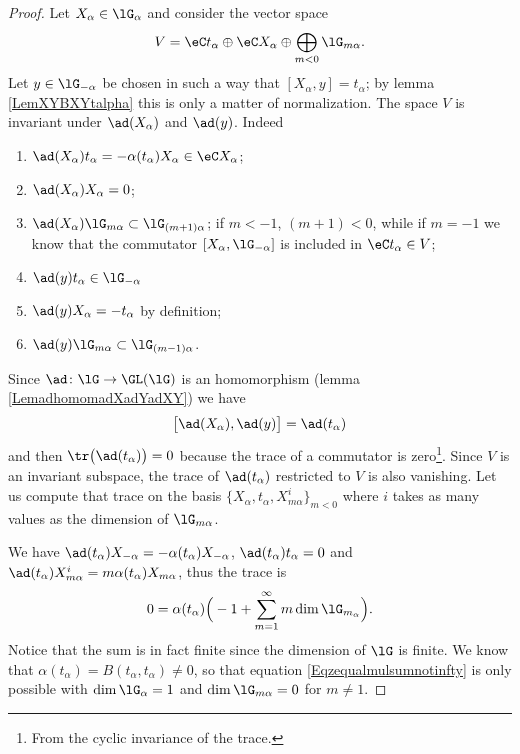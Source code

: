 \begin{proof}
    Let \( X_{\alpha}\in\lG_{\alpha}\) and consider the vector space
    \begin{equation}
        V=\eC t_{\alpha}\oplus\eC X_{\alpha}\oplus\bigoplus_{m<0}\lG_{m\alpha}.
    \end{equation}
    Let \( y\in\lG_{-\alpha}\) be chosen in such a way that \( [X_{\alpha},y]=t_{\alpha}\); by lemma \ref{LemXYBXYtalpha} this is only a matter of normalization. The space \( V\) is invariant under \( \ad(X_{\alpha})\) and \( \ad(y)\). Indeed
    \begin{enumerate}
        \item
            \( \ad(X_{\alpha})t_{\alpha}=-\alpha(t_{\alpha})X_{\alpha}\in\eC X_{\alpha}\);
        \item
            \( \ad(X_{\alpha})X_{\alpha}=0\);
        \item
            \( \ad(X_{\alpha})\lG_{m\alpha}\subset\lG_{(m+1)\alpha}\); if \( m<-1\), \( (m+1)<0\), while if \( m=-1\) we know that the commutator \( [X_{\alpha},\lG_{-\alpha}]\) is included in \( \eC t_{\alpha}\in V\);
        \item
            \( \ad(y)t_{\alpha}\in\lG_{-\alpha}\)
        \item
            \( \ad(y)X_{\alpha}=-t_{\alpha}\) by definition;
        \item
            \( \ad(y)\lG_{m\alpha}\subset\lG_{(m-1)\alpha}\).
    \end{enumerate}
    Since \( \ad\colon \lG\to \GL(\lG)\) is an homomorphism (lemma \ref{LemadhomomadXadYadXY}) we have
    \begin{equation}
        \big[ \ad(X_{\alpha}),\ad(y) \big]=\ad(t_{\alpha})
    \end{equation}
    and then \( \tr\big( \ad(t_{\alpha}) \big)=0\) because the trace of a commutator is zero\footnote{From the cyclic invariance of the trace.}. Since \( V\) is an invariant subspace, the trace of \( \ad(t_{\alpha})\) restricted to \( V\) is also vanishing. Let us compute that trace on the basis \( \{ X_{\alpha},t_{\alpha},X^i_{m\alpha} \}_{m<0}\) where \( i\) takes as many values as the dimension of \( \lG_{m\alpha}\).

    We have \( \ad(t_{\alpha})X_{-\alpha}=-\alpha(t_{\alpha})X_{-\alpha}\), \( \ad(t_{\alpha})t_{\alpha}=0\) and \( \ad(t_{\alpha})X^i_{m\alpha}=m\alpha(t_{\alpha})X_{m\alpha}\), thus the trace is
    \begin{equation}    \label{Eqzequalmulsumnotinfty}
        0=\alpha(t_{\alpha})\Big( -1+\sum_{m=1}^{\infty}m\dim\lG_{m_{\alpha}} \Big).
    \end{equation}
    Notice that the sum is in fact finite since the dimension of \( \lG\) is finite. We know that \( \alpha(t_{\alpha})=B(t_{\alpha},t_{\alpha})\neq 0\), so that equation \eqref{Eqzequalmulsumnotinfty} is only possible with \( \dim\lG_{\alpha}=1\) and \( \dim\lG_{m\alpha}=0\) for \( m\neq 1\).
\end{proof}

